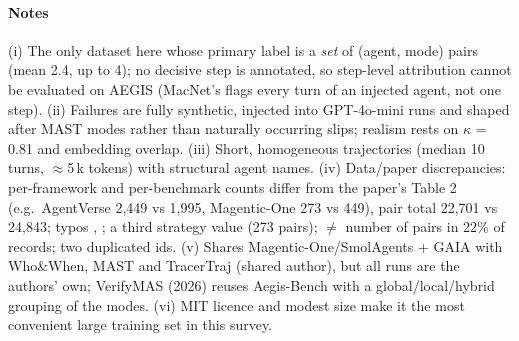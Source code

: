 \paragraph{Notes} (i) The only dataset here whose primary label is a \emph{set} of (agent, mode) pairs (mean 2.4, up to 4); no decisive step is annotated, so step-level attribution cannot be evaluated on AEGIS (MacNet's  flags every turn of an injected agent, not one step). (ii) Failures are fully synthetic, injected into GPT-4o-mini runs and shaped after MAST modes rather than naturally occurring slips; realism rests on $\kappa$ = 0.81 and embedding overlap. (iii) Short, homogeneous trajectories (median 10 turns, $\approx$5\,k tokens) with structural agent names. (iv) Data/paper discrepancies: per-framework and per-benchmark counts differ from the paper's Table 2 (e.g.\ AgentVerse 2,449 vs 1,995, Magentic-One 273 vs 449), pair total 22,701 vs 24,843; typos , ; a third strategy value  (273 pairs);  $\ne$ number of pairs in 22\% of records; two duplicated ids. (v) Shares Magentic-One/SmolAgents + GAIA with Who\&When, MAST and TracerTraj (shared author), but all runs are the authors' own; VerifyMAS (2026) reuses Aegis-Bench with a global/local/hybrid grouping of the modes. (vi) MIT licence and modest size make it the most convenient large training set in this survey.
